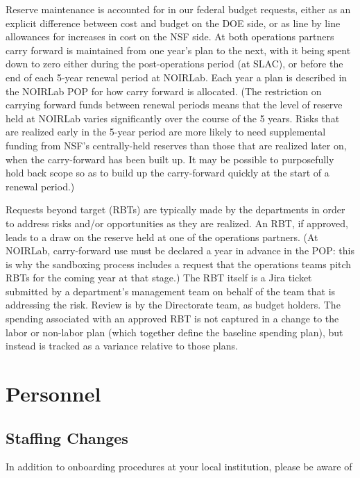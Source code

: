 Reserve maintenance is accounted for in our federal budget requests, either as an explicit difference between cost and budget on the \gls{DOE} side, or as line by line allowances for increases in cost on the \gls{NSF} side.
At both operations partners carry forward is maintained from one year's plan to the next, with it being spent down to zero either during the post-operations period (at \gls{SLAC}), or before the end of each 5-year renewal period at \gls{NOIRLab}.
Each year a plan is described in the \gls{NOIRLab} \gls{POP} for how carry forward is allocated.
(The restriction on carrying forward funds between renewal periods means that the level of reserve held at \gls{NOIRLab} varies significantly over the course of the 5 years.
Risks that are realized early in the 5-year period are more likely to need supplemental funding from \gls{NSF}'s centrally-held reserves than those that are realized later on, when the carry-forward has been built up.
It may be possible to purposefully hold back scope so as to build up the carry-forward quickly at the start of a renewal period.)

Requests beyond target (RBTs) are typically made by the departments in order to address risks and/or opportunities as they are realized.
An \gls{RBT}, if approved, leads to a draw on the reserve held at one of the operations partners.
(At \gls{NOIRLab}, carry-forward use must be declared a year in advance in the \gls{POP}: this is why the sandboxing process includes a request that the operations teams pitch RBTs for the coming year at that stage.)
The \gls{RBT} itself is a Jira ticket submitted by a department's management team on behalf of the team that is addressing the risk.
Review is by the Directorate team, as budget holders.
The spending associated with an approved \gls{RBT} is not captured in a change to the labor or non-labor plan (which together define the baseline spending plan), but instead is tracked as a variance relative to those plans.

\section{Personnel}

\subsection{Staffing Changes}
\label{sec:staffing}

In addition to onboarding procedures at your local institution, please
be aware of

